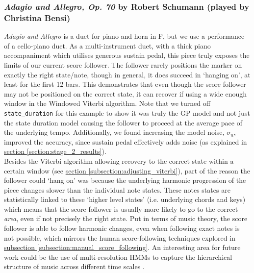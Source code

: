 
\subsubsection{\textit{Adagio and Allegro, Op. 70} by Robert Schumann (played by Christina Bensi)}{\label{subsubsection:Christina}
\textit{Adagio and Allegro} is a duet for piano and horn in F, but we use a performance of a cello-piano duet. As a multi-instrument duet, with a thick piano accompaniment which utilises generous sustain pedal, this piece truly exposes the limits of our current score follower. The follower rarely positions the marker on exactly the right state/note, though in general, it does succeed in `hanging on', at least for the first 12 bars. This demonstrates that even though the score follower may not be positioned on the correct state, it can recover if using a wide enough window in the Windowed Viterbi algorithm. Note that we turned off \verb|state_duration| for this example to show it was truly the GP model and not just the state duration model causing the follower to proceed at the average pace of the underlying tempo. Additionally, we found increasing the model noise, $\sigma_n$, improved the accuracy, since sustain pedal effectively adds noise (as explained in \hyperref[section:stage_2_results]{section \ref*{section:stage_2_results}}).  \\

Besides the Viterbi algorithm allowing recovery to the correct state within a certain window (see \hyperref[subsection:adjusting_viterbi]{section \ref*{subsection:adjusting_viterbi}}), part of the reason the follower could `hang on' was because the underlying \gls{harmonic progression} of the piece changes slower than the individual note states. These notes states are statistically linked to these `higher level states' (i.e. underlying chords and \gls{key}s) which means that the score follower is usually more likely to go to the correct \textit{area}, even if not precisely the right state. Put in terms of music theory, the score follower is able to follow harmonic changes, even when following exact notes is not possible, which mirrors the human score-following techniques explored in \hyperref[subsection:manual_score_following]{subsection \ref*{subsection:manual_score_following}}. An interesting area for future work could be the use of multi-resolution HMMs to capture the hierarchical structure of music across different time scales \cite{Baggenstoss}.    


}
